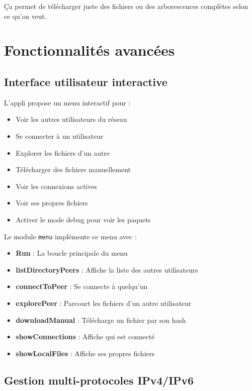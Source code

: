 \documentclass[11pt,a4paper]{report}
\begin{document}
Ça permet de télécharger juste des fichiers ou des arborescences complètes selon ce qu'on veut.

\chapter{Fonctionnalités avancées}

\section{Interface utilisateur interactive}

L'appli propose un menu interactif pour :

\begin{itemize}
    \item Voir les autres utilisateurs du réseau
    \item Se connecter à un utilisateur
    \item Explorer les fichiers d'un autre
    \item Télécharger des fichiers manuellement
    \item Voir les connexions actives
    \item Voir ses propres fichiers
    \item Activer le mode debug pour voir les paquets
\end{itemize}

Le module \texttt{menu} implémente ce menu avec :

\begin{itemize}
    \item \textbf{Run} : La boucle principale du menu
    \item \textbf{listDirectoryPeers} : Affiche la liste des autres utilisateurs
    \item \textbf{connectToPeer} : Se connecte à quelqu'un
    \item \textbf{explorePeer} : Parcourt les fichiers d'un autre utilisateur
    \item \textbf{downloadManual} : Télécharge un fichier par son hash
    \item \textbf{showConnections} : Affiche qui est connecté
    \item \textbf{showLocalFiles} : Affiche ses propres fichiers
\end{itemize}

\section{Gestion multi-protocoles IPv4/IPv6}
\end{document}
